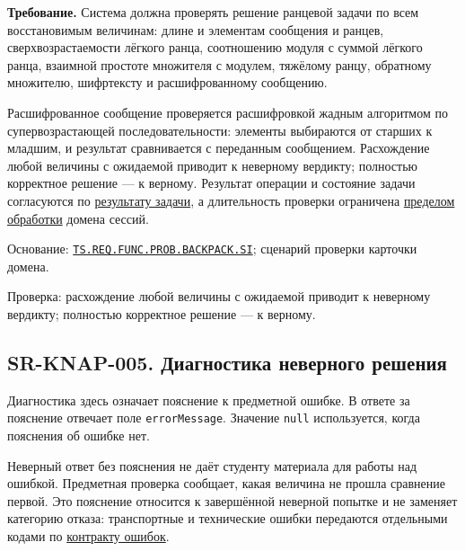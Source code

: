 \documentclass[12pt,a4paper]{article}
\begin{document}
\textbf{Требование.} Система должна проверять решение ранцевой задачи по всем восстановимым величинам: длине и элементам сообщения и ранцев, сверхвозрастаемости лёгкого ранца, соотношению модуля с суммой лёгкого ранца, взаимной простоте множителя с модулем, тяжёлому ранцу, обратному множителю, шифртексту и расшифрованному сообщению.

Расшифрованное сообщение проверяется расшифровкой жадным алгоритмом по супервозрастающей последовательности: элементы выбираются от старших к младшим, и результат сравнивается с переданным сообщением. Расхождение любой величины с ожидаемой приводит к неверному вердикту; полностью корректное решение --- к верному. Результат операции и состояние задачи согласуются по {\hyperlink{sr-ses-005-результат-задачи}{результату задачи}}, а длительность проверки ограничена {\hyperlink{sr-ses-012-ограниченная-длительность-обработки}{пределом обработки}} домена сессий.

Основание: {\href{../02\_Техническое\_задание/DOC-02\_Техническое\_задание.pdf\#ts-req-func-prob-backpack-si}{\texttt{TS.\allowbreak{}REQ.\allowbreak{}FUNC.\allowbreak{}PROB.\allowbreak{}BACKPACK.\allowbreak{}SI}}}; сценарий проверки карточки домена.

Проверка: расхождение любой величины с ожидаемой приводит к неверному вердикту; полностью корректное решение --- к верному.

\subsection{SR-KNAP-005. Диагностика неверного решения}\label{sr-knap-005-ux434ux438ux430ux433ux43dux43eux441ux442ux438ux43aux430-ux43dux435ux432ux435ux440ux43dux43eux433ux43e-ux440ux435ux448ux435ux43dux438ux44f}

\hypertarget{sr-knap-005-диагностика-неверного-решения}{}

\hypertarget{sr-knap-005}{}

Диагностика здесь означает пояснение к предметной ошибке. В ответе за пояснение отвечает поле \texttt{errorMessage}. Значение \texttt{null} используется, когда пояснения об ошибке нет.

Неверный ответ без пояснения не даёт студенту материала для работы над ошибкой. Предметная проверка сообщает, какая величина не прошла сравнение первой. Это пояснение относится к завершённой неверной попытке и не заменяет категорию отказа: транспортные и технические ошибки передаются отдельными кодами по {\href{../07\_Программные\_требования/DOC-06.2\_Сессии\_задач\_и\_планировщик.pdf\#коды-и-представление-ошибок}{контракту ошибок}}.
\end{document}
